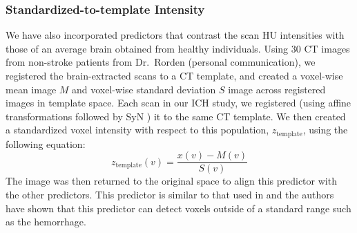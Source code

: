 \documentclass{elsarticle_nonatbib}\usepackage[]{graphicx}\usepackage[]{color}
\begin{document}
\subsubsection{Standardized-to-template Intensity}
We have also incorporated predictors that contrast the scan HU intensities with those of an average brain obtained from healthy individuals.  Using $30$ CT images from non-stroke patients from Dr.~Rorden (personal communication), we registered the brain-extracted scans to a CT template, and created a voxel-wise mean image $M$ and voxel-wise standard deviation $S$ image across registered images in template space.  Each scan in our ICH study, we registered (using affine transformations followed by SyN \citep{avants_symmetric_2008}) it to the same CT template. We then  created a standardized voxel intensity with respect to this population, $z_{\text{template}}$, using the following equation:
$$
z_{\text{template}}(v) = \frac{x(v) - M(v)}{S(v)}
$$
The image was then returned to the original space to align this predictor with the other predictors.  This predictor is similar to that used in \citet{gillebert_automated_2014} and the authors have shown that this predictor can detect voxels outside of a standard range such as the hemorrhage. 


\end{document}
